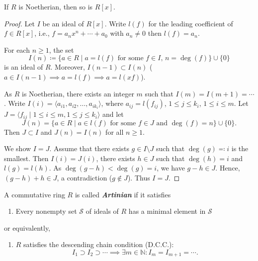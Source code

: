 \documentclass[twoside]{article}
\newcommand\N{\mathbb N}
\theoremstyle{remark}
\newcounter{theorem}
\newcommand*\term[1]{\textbf{\textit{\mathversion{bold}#1}}}
\begin{document}
\begin{theorem}
  If \(R\) is Noetherian, then so is \(R[x]\).
\end{theorem}

\begin{proof}
  Let \(I\) be an ideal of \(R[x]\). Write \(l(f)\) for the leading coefficient of \(f \in R[x]\), i.e., \(f = a_nx^n + \cdots + a_0\) with \(a_n \neq 0\) then \(l(f) = a_n\).
  
  For each \(n \geq 1\), the set
  \[ I(n) \coloneq \{ a \in R \mid \text{\(a = l(f)\) for some \(f \in I\), \(n = \deg (f)\)}\} \cup \{0\} \]
  is an ideal of \(R\). Moreover, \(I(n-1) \subset I(n)\) (\(a \in I(n-1) \implies a = l(f) \implies a = l(xf)\)).
  
  As \(R\) is Noetherian, there exists an integer \(m\) such that \(I(m) = I(m+1) = \cdots\). Write \(I(i) = \langle a_{i1}, a_{i2}, \dots, a_{ik_i}\rangle\), where \(a_{ij} = l(f_{ij})\), \(1 \leq j \leq k_i\), \(1 \leq i \leq m\). Let \(J = \langle f_{ij} \mid 1 \leq i \leq m, 1 \leq j \leq k_i\rangle\) and let
  \[ J(n) = \{a \in R \mid \text{\(a \in l(f)\) for some \(f \in J\) and \(\deg (f) = n\)}\} \cup \{0\}. \]
  Then \(J \subset I\) and \(J(n) = I(n)\) for all \(n \geq 1\).
  
  We show \(I = J\). Assume that there exists \(g \in I \setminus J\) such that \(\deg(g) \eqcolon i\) is the smallest. Then \(I(i) = J(i)\), there exists \(h \in J\) such that \(\deg (h) = i\) and \(l(g) = l(h)\). As \(\deg(g-h) < \deg(g) = i\), we have \(g-h \in J\). Hence, \((g-h) + h \in J\), a contradiction (\(g \notin J\)). Thus \(I = J\).
\end{proof}

\begin{definition}%
  A commutative ring \(R\) is called \term{Artinian} if it satisfies
  \begin{enumerate}[label=(\arabic*)]
    \item Every nonempty set \(\mathcal S\) of ideals of \(R\) has a minimal element in \(\mathcal S\)
  \end{enumerate}
  or equivalently,
  \begin{enumerate}[resume*]
    \item \(R\) satisfies the descending chain condition (D.C.C.):
    \[ I_1 \supset I_2 \supset \cdots \implies \exists m \in \N: I_m = I_{m+1} = \cdots. \]
  \end{enumerate}
\end{definition}
\end{document}
